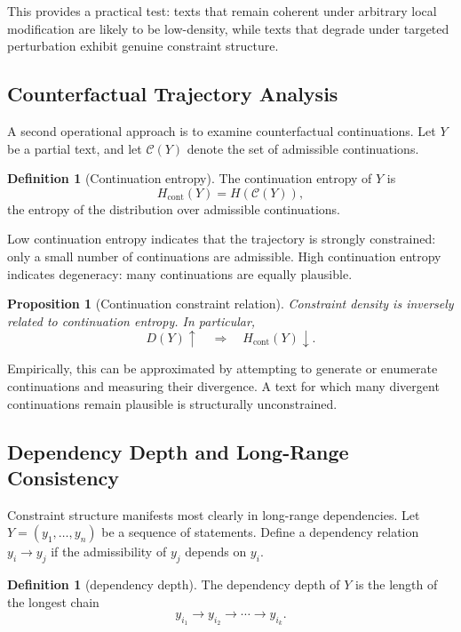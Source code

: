 \documentclass[12pt, oneside]{article}
\theoremstyle{plain}
\newtheorem{proposition}[theorem]{Proposition}
\theoremstyle{definition}
\newtheorem{definition}[theorem]{Definition}
\theoremstyle{remark}
\begin{document}
This provides a practical test: texts that remain coherent under arbitrary local
modification are likely to be low-density, while texts that degrade under targeted
perturbation exhibit genuine constraint structure.

\subsection{Counterfactual Trajectory Analysis}

A second operational approach is to examine counterfactual continuations. Let $Y$
be a partial text, and let $\mathcal{C}(Y)$ denote the set of admissible continuations.

\begin{definition}[Continuation entropy]
The continuation entropy of $Y$ is
\[
  H_{\text{cont}}(Y) = H(\mathcal{C}(Y)),
\]
the entropy of the distribution over admissible continuations.
\end{definition}

Low continuation entropy indicates that the trajectory is strongly constrained:
only a small number of continuations are admissible. High continuation entropy
indicates degeneracy: many continuations are equally plausible.

\begin{proposition}[Continuation constraint relation]
Constraint density is inversely related to continuation entropy. In particular,
\[
  D(Y) \uparrow \quad \Rightarrow \quad H_{\text{cont}}(Y) \downarrow.
\]
\end{proposition}

Empirically, this can be approximated by attempting to generate or enumerate
continuations and measuring their divergence. A text for which many divergent
continuations remain plausible is structurally unconstrained.

\subsection{Dependency Depth and Long-Range Consistency}

Constraint structure manifests most clearly in long-range dependencies. Let
$Y = (y_1, \dots, y_n)$ be a sequence of statements. Define a dependency relation
$y_i \rightarrow y_j$ if the admissibility of $y_j$ depends on $y_i$.

\begin{definition}[dependency depth]
The dependency depth of $Y$ is the length of the longest chain
\[
  y_{i_1} \rightarrow y_{i_2} \rightarrow \cdots \rightarrow y_{i_k}.
\]
\end{definition}
\end{document}
